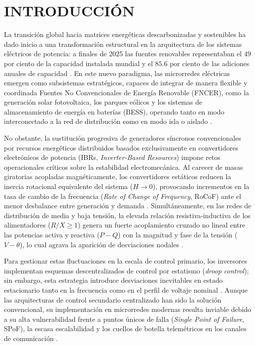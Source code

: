 \section*{INTRODUCCIÓN}

La transición global hacia matrices energéticas descarbonizadas y sostenibles ha dado inicio a una transformación estructural en la arquitectura de los sistemas eléctricos de potencia: a finales de 2025 las fuentes renovables representaban el $49$ por ciento de la capacidad instalada mundial y el $85.6$ por ciento de las adiciones anuales de capacidad \citep{IRENA2026}. En este nuevo paradigma, las microrredes eléctricas emergen como subsistemas estratégicos, capaces de integrar de manera flexible y coordinada Fuentes No Convencionales de Energía Renovable (FNCER), como la generación solar fotovoltaica, los parques eólicos y los sistemas de almacenamiento de energía en baterías (BESS), operando tanto en modo interconectado a la red de distribución como en modo isla o aislado \citep{Mamun2026, Altin2023MultiAgent}.

No obstante, la sustitución progresiva de generadores síncronos convencionales por recursos energéticos distribuidos basados exclusivamente en convertidores electrónicos de potencia (IBRs, \textit{Inverter-Based Resources}) impone retos operacionales críticos sobre la estabilidad electromecánica. Al carecer de masas giratorias acopladas magnéticamente, los convertidores estáticos reducen la inercia rotacional equivalente del sistema ($H \to 0$), provocando incrementos en la tasa de cambio de la frecuencia (\textit{Rate of Change of Frequency}, RoCoF) ante el menor desbalance entre generación y demanda \citep{Mehrzad2025}. Simultáneamente, en las redes de distribución de media y baja tensión, la elevada relación resistiva-inductiva de los alimentadores ($R/X \ge 1$) genera un fuerte acoplamiento cruzado no lineal entre las potencias activa y reactiva ($P-Q$) con la magnitud y fase de la tensión ($V-\theta$), lo cual agrava la aparición de desviaciones nodales \citep{Sowa2023, Pompodakis2022Sensitivity}.

Para gestionar estas fluctuaciones en la escala de control primario, los inversores implementan esquemas descentralizados de control por estatismo (\textit{droop control}); sin embargo, esta estrategia introduce desviaciones inevitables en estado estacionario tanto en la frecuencia como en el perfil de voltaje nominal \citep{Jasim2023}. Aunque las arquitecturas de control secundario centralizado han sido la solución convencional, su implementación en microrredes modernas resulta inviable debido a su alta vulnerabilidad frente a puntos únicos de falla (\textit{Single Point of Failure}, SPoF), la escasa escalabilidad y los cuellos de botella telemétricos en los canales de comunicación \citep{Khayat2020, Altin2023MultiAgent}.

